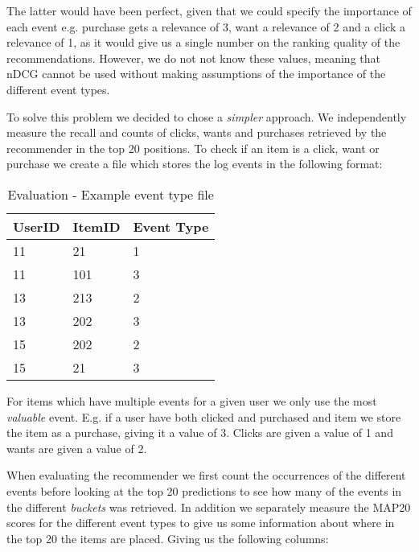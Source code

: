 The latter would have been perfect, given that we could specify the importance of each event e.g. purchase gets a relevance of 3, want
a relevance of 2 and a click a relevance of 1, as it would give us a single number on the ranking quality of the recommendations.
However, we do not not know these values, meaning that nDCG cannot be used without making assumptions of the importance of the different
event types.


To solve this problem we decided to chose a \emph{simpler} approach. We independently measure the recall and counts of clicks,
wants and purchases retrieved by the recommender in the top 20 positions. To check if an item is a click, want or purchase
we create a file which stores the log events in the following format:

\begin{table}[H]
\label{table:event-type}
\centering
\begin{tabular}{*{3}l}
\toprule
UserID	&	ItemID	 &  Event Type  \\ \midrule
11		&	21		 &	1			\\
11		&	101		 &	3			\\
13		&	213		 &	2			\\
13		&	202		 &  3			\\
15		&	202		 &  2			\\
15		&	21		 &  3			\\
\bottomrule
\end{tabular}
\caption{Evaluation - Example event type file}
\end{table}

For items which have multiple events for a given user we only use the most \emph{valuable} event. E.g. if a user have
both clicked and purchased and item we store the item as a purchase, giving it a value of 3. Clicks are given a value of 1 and wants are given a value of 2.

When evaluating the recommender we first count the occurrences of the different events before looking at the top 20 predictions to see how many of the
events in the different \emph{buckets} was retrieved. In addition we separately measure the MAP\@20 scores for the different
event types to give us some information about where in the top 20 the items are placed. Giving us the following columns:

